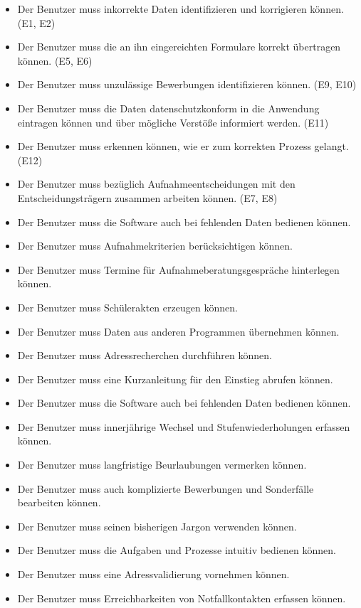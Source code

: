 \begin{itemize}
     \item Der Benutzer muss inkorrekte Daten identifizieren und korrigieren können. (E1, E2)
     \item Der Benutzer muss die an ihn eingereichten Formulare korrekt übertragen können. (E5, E6)
     \item Der Benutzer muss unzulässige Bewerbungen identifizieren können. (E9, E10)
     \item Der Benutzer muss die Daten datenschutzkonform in die Anwendung eintragen können und über mögliche Verstöße informiert werden. (E11)
     \item Der Benutzer muss erkennen können, wie er zum korrekten Prozess gelangt. (E12)
     \item Der Benutzer muss bezüglich Aufnahmeentscheidungen mit den Entscheidungsträgern zusammen arbeiten können. (E7, E8)
     \item Der Benutzer muss die Software auch bei fehlenden Daten bedienen können. 
     \item Der Benutzer muss Aufnahmekriterien berücksichtigen können.
     \item Der Benutzer muss Termine für Aufnahmeberatungsgespräche hinterlegen können.
     \item Der Benutzer muss Schülerakten erzeugen können.
     \item Der Benutzer muss Daten aus anderen Programmen übernehmen können.
     \item Der Benutzer muss Adressrecherchen durchführen können.
     \item Der Benutzer muss eine Kurzanleitung für den Einstieg abrufen können.
     \item Der Benutzer muss die Software auch bei fehlenden Daten bedienen können.
     \item Der Benutzer muss innerjährige Wechsel und Stufenwiederholungen erfassen können.
     \item Der Benutzer muss langfristige Beurlaubungen vermerken können.
     \item Der Benutzer muss auch komplizierte Bewerbungen und Sonderfälle bearbeiten können.
     \item Der Benutzer muss seinen bisherigen Jargon verwenden können.
     \item Der Benutzer muss die Aufgaben und Prozesse intuitiv bedienen können.
     \item Der Benutzer muss eine Adressvalidierung vornehmen können.
     \item Der Benutzer muss Erreichbarkeiten von Notfallkontakten erfassen können.

\end{itemize}
